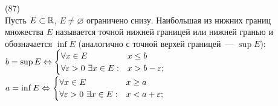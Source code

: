 (87)\\
Пусть $E \subset \mathbb{R}$, $E \neq \varnothing$ ограничено снизу. Наибольшая из нижних границ множества $E$ называется точной нижней границей или нижней гранью и обозначается $\inf E$ (аналогично с точной верхей границей~--- $\sup E$):\\
$b = \sup E \Leftrightarrow 
\begin{cases}
\forall x \in E & x \le b\\
\forall\varepsilon > 0\ \exists x \in E: & x > b - \varepsilon;	
\end{cases}$\\
$a = \inf E \Leftrightarrow
\begin{cases}
\forall x \in E & x \ge a\\
\forall\varepsilon > 0\ \exists x \in E: & x < a + \varepsilon;	
\end{cases}$
